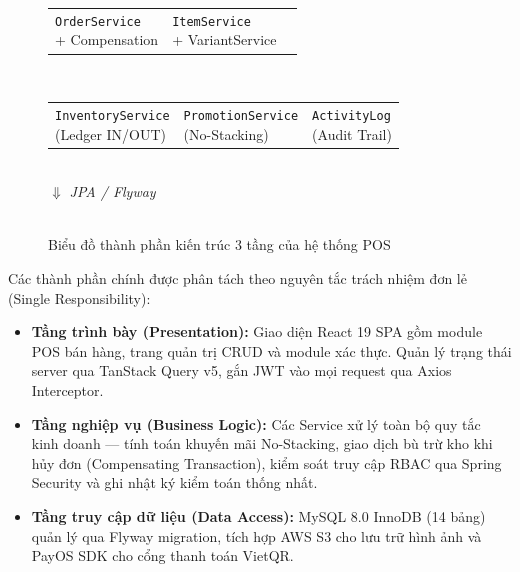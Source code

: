 \begin{figure}[H]
\begin{minipage}{0.95\textwidth}
{{{{\begin{tabularx}{0.9\textwidth}{XXX}
            \fbox{\parbox{2.5cm}{\centering \small \texttt{OrderService}\\+ Compensation}} &
            \fbox{\parbox{2.5cm}{\centering \small \texttt{ItemService}\\+ VariantService}}
        \end{tabularx}\\[1mm]
        \begin{tabularx}{0.9\textwidth}{XXX}
            \fbox{\parbox{2.5cm}{\centering \small \texttt{InventoryService}\\(Ledger IN/OUT)}} &
            \fbox{\parbox{2.5cm}{\centering \small \texttt{PromotionService}\\(No-Stacking)}} &
            \fbox{\parbox{2.5cm}{\centering \small \texttt{ActivityLog}\\(Audit Trail)}}
        \end{tabularx}
        }}\\[3mm]
        $\Downarrow$ \textit{JPA / Flyway}\\[2mm]
        \\[2mm]
    }
}
\end{minipage}
\caption{Biểu đồ thành phần kiến trúc 3 tầng của hệ thống POS}
\label{fig:component_diagram}
\end{figure}

Các thành phần chính được phân tách theo nguyên tắc trách nhiệm đơn lẻ (Single Responsibility):
\begin{itemize}[leftmargin=1.5cm]
    \item \textbf{Tầng trình bày (Presentation):} Giao diện React 19 SPA gồm module POS bán hàng, trang quản trị CRUD và module xác thực. Quản lý trạng thái server qua TanStack Query v5, gắn JWT vào mọi request qua Axios Interceptor.
    \item \textbf{Tầng nghiệp vụ (Business Logic):} Các Service xử lý toàn bộ quy tắc kinh doanh --- tính toán khuyến mãi No-Stacking, giao dịch bù trừ kho khi hủy đơn (Compensating Transaction), kiểm soát truy cập RBAC qua Spring Security và ghi nhật ký kiểm toán thống nhất.
    \item \textbf{Tầng truy cập dữ liệu (Data Access):} MySQL 8.0 InnoDB (14 bảng) quản lý qua Flyway migration, tích hợp AWS S3 cho lưu trữ hình ảnh và PayOS SDK cho cổng thanh toán VietQR.
\end{itemize}

